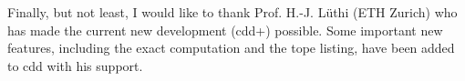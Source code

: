 \documentclass[11pt]{article}
\begin{document}
Finally, but not least, I would like to thank Prof. H.-J. L\"uthi
(ETH Zurich) who has made the current new development (cdd+)
possible.  Some important new features, including the exact computation
and the tope listing, have been added to cdd with his support.




\end{document}
